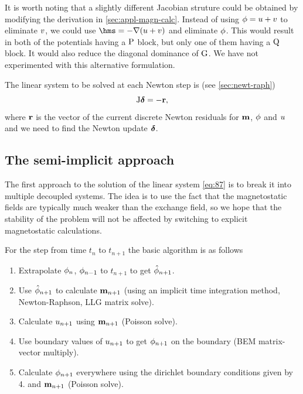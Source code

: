 It is worth noting that a slightly different Jacobian struture could be obtained by modifying the derivation in \cref{sec:appl-magn-calc}.
Instead of using $\phi = u + v$ to eliminate $v$, we could use $\hms = - \grad ( \phione + \phitwo)$ and eliminate $\phi$.
This would result in both of the potentials having a $\mathrm{P}$ block, but only one of them having a $\mathrm{Q}$ block.
It would also reduce the diagonal dominance of ${\mathbf{\mathrm{G}}}$.
We have not experimented with this alternative formulation.

The linear system to be solved at each Newton step is (see \cref{sec:newt-raph})
\begin{equation}
  \mathrm{J} \boldsymbol{\mathrm{\delta}} = -\boldsymbol{\mathrm{r}},
  \label{eq:87}
\end{equation}
where $\boldsymbol{\mathrm{r}}$ is the vector of the current discrete Newton residuals for $\boldsymbol{\mathrm{m}}$, $\phi$ and $u$ and we need to find the Newton update $\boldsymbol{\mathrm{\delta}}$.


\subsection{The semi-implicit approach}
\label{sec:semi-implicit-bem}

The first approach to the solution of the linear system \cref{eq:87} is to break it into multiple decoupled systems.
The idea is to use the fact that the magnetostatic fields are typically much weaker than the exchange field, so we hope that the stability of the problem will not be affected by switching to explicit magnetostatic calculations.


For the step from time $t_n$ to $t_{n+1}$ the basic algorithm is as follows
\begin{enumerate}
\item Extrapolate $\phi_n$, $\phi_{n-1}$ to $t_{n+1}$ to get $\hat{\phi}_{n+1}$.
\item Use $\hat{\phi}_{n+1}$ to calculate $\boldsymbol{\mathrm{m}}_{n+1}$ (using an implicit time integration method, Newton-Raphson, LLG matrix solve).
\item Calculate $u_{n+1}$ using $\boldsymbol{\mathrm{m}}_{n+1}$ (Poisson solve).
\item Use boundary values of $u_{n+1}$ to get $\phi_{n+1}$ on the boundary (BEM matrix-vector multiply).
\item Calculate $\phi_{n+1}$ everywhere using the dirichlet boundary conditions given by 4. and $\boldsymbol{\mathrm{m}}_{n+1}$ (Poisson solve).
\end{enumerate}

